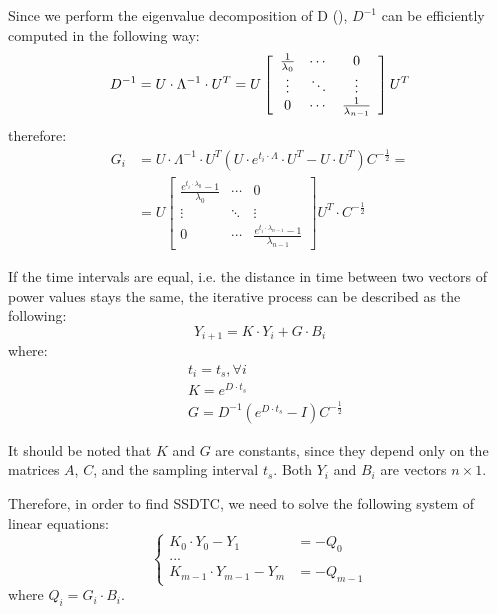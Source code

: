 Since we perform the eigenvalue decomposition of D (), $D^{-1}$ can be efficiently computed in the following way:
\[
  D^{-1} = U \cdot \Lambda^{-1} \cdot U^T = U \left[
      \begin{array}{ccc}
        \frac{1}{\lambda_0} & \cdots & 0 \\
        \vdots & \ddots & \vdots \\
        0 & \cdots & \frac{1}{\lambda_{n - 1}}
      \end{array}
    \right] U^T \\
\]
therefore:
\begin{align*}
  G_i & = U \cdot \Lambda^{-1} \cdot U^T (U \cdot e^{t_i \cdot \Lambda} \cdot U^T - U \cdot U^T) C^{-\frac{1}{2}} = \\
      & = U \left[
        \begin{array}{ccc}
          \frac{e^{t_i \cdot \lambda_0} - 1}{\lambda_0} & \cdots & 0 \\
          \vdots & \ddots & \vdots \\
          0 & \cdots & \frac{e^{t_i \cdot \lambda_{n - 1}} - 1}{\lambda_{n - 1}}
        \end{array}
      \right] U^T \cdot C^{-\frac{1}{2}}
\end{align*}

If the time intervals are equal, i.e. the distance in time between two vectors of power values stays the same, the iterative process can be described as the following:
\[
  Y_{i+1} = K \cdot Y_i + G \cdot B_i
\]
where:
\begin{align*}
  & t_i = t_s, \forall i \\
  & K = e^{D \cdot t_s} \\
  & G = D^{-1}(e^{D \cdot t_s}-I) C^{-\frac{1}{2}}
\end{align*}

It should be noted that $K$ and $G$ are constants, since they depend only on the matrices $A$, $C$, and the sampling interval $t_s$.  Both $Y_i$ and $B_i$ are vectors $n \times 1$.

Therefore, in order to find SSDTC, we need to solve the following system of linear equations:
\[
  \begin{cases}
    K_0 \cdot Y_0 - Y_1 & = -Q_0 \\
    ... \\
    K_{m-1} \cdot Y_{m-1} - Y_{m} & = -Q_{m-1}
  \end{cases}
\]
where $Q_i = G_i \cdot B_i$.

